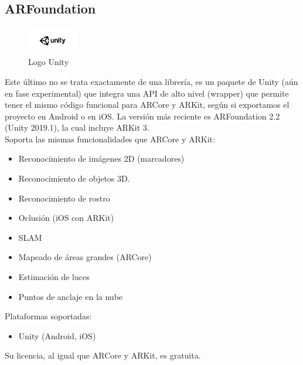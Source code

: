 \subsection{ARFoundation}
\begin{figure}[H]
    \centering
    \includegraphics[width=0.2\textwidth]{Images/Unity_Logo.jpeg}
    \caption{Logo Unity}
    \label{fig:my_label}
\end{figure}

Este último no se trata exactamente de una librería, es un paquete de Unity (aún en fase experimental) que integra una API de alto nivel (wrapper) que permite tener el mismo código funcional para ARCore y ARKit, según si exportamos el proyecto en Android o en iOS. La versión más reciente es ARFoundation 2.2 (Unity 2019.1), la cual incluye ARKit 3.\cite{ARFoundation}\\
Soporta las mismas funcionalidades que ARCore y ARKit:
\begin{itemize}
\item Reconocimiento de imágenes 2D (marcadores)
\item Reconocimiento de objetos 3D.
\item Reconocimiento de rostro 
\item Oclusión (iOS con ARKit)
\item SLAM
\item Mapeado de áreas grandes (ARCore)
\item Estimación de luces
\item Puntos de anclaje en la nube
\end{itemize}

Plataformas soportadas:
\begin{itemize}
\item Unity (Android, iOS)
\end{itemize}

Su licencia, al igual que ARCore y ARKit, es gratuita.

\noindent
